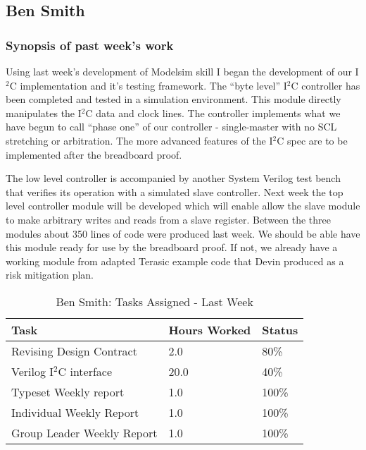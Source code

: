 \documentclass[12pt,compsoc]{IEEEtran}
\begin{document}
\subsection{Ben Smith}

	\subsubsection*{Synopsis of past week's work}
	Using last week’s development of Modelsim skill I began the development of our I$^2$C implementation and
	it's testing framework. The “byte level” I$^2$C controller has been completed and tested in a simulation environment. This module 
    directly manipulates the I$^2$C data and clock lines. The controller implements what we have begun 
	to call “phase one” of our controller - single-master with no SCL stretching or arbitration. The more 
	advanced features of the I$^2$C spec are to be implemented after the breadboard proof. 

	The low level controller is accompanied by another System Verilog test bench that verifies its operation 
	with a simulated slave controller. Next week the top level controller module will be developed which will 
	enable allow the slave module to make arbitrary writes and reads from a slave register. Between the three
	modules about 350 lines of code were produced last week. We should be able have this module ready for use
	by the breadboard proof. If not, we already have a working module from adapted Terasic example code 
	that Devin produced as a risk mitigation plan. 

	\begin{table}[ht]
	\renewcommand{\arraystretch}{1.3}
		\caption{Ben Smith: Tasks Assigned - Last Week}
		
		\label{Summary of Ben Smith's activities: last week}
		
		\centering
		\begin{tabular}{p{5.5cm}|p{1cm}|p{1cm}}

		\hline
		\bfseries 		Task				        & \bfseries Hours Worked	& \bfseries Status	\\
		\hline\hline
                    Revising Design Contract        & 2.0                       & 80\%              \\
                    Verilog I$^2$C interface        & 20.0                      & 40\%              \\
                    Typeset Weekly report 			& 1.0						& 100\% 			\\
                    Individual Weekly Report		& 1.0 						& 100\% 			\\
                    Group Leader Weekly Report 		& 1.0						& 100\% 			\\
		\hline
		\end{tabular}
	\end{table}
\end{document}
